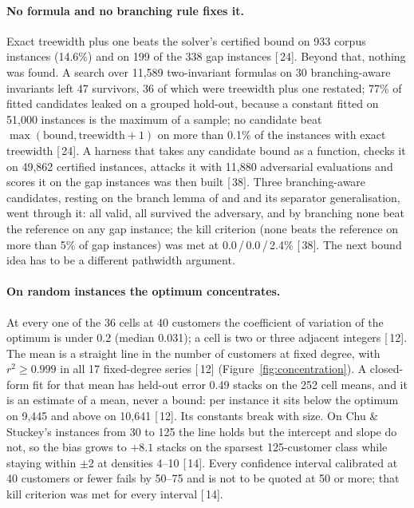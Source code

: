 \documentclass[11pt,a4paper]{article}
\renewcommand{\S}[1]{[\textsection\,#1]}
\begin{document}
\paragraph{No formula and no branching rule fixes it.}
Exact treewidth plus one beats the solver's certified bound on 933 corpus
instances (14.6\%) and on 199 of the 338 gap instances \S{24}. Beyond that,
nothing was found. A search over 11,589 two-invariant formulas on 30
branching-aware invariants left 47 survivors, 36 of which were treewidth plus
one restated; 77\% of fitted candidates leaked on a grouped hold-out, because
a constant fitted on 51,000 instances is the maximum of a sample; no
candidate beat $\max(\text{bound}, \text{treewidth}+1)$ on more than 0.1\% of
the instances with exact treewidth \S{24}. A harness that takes any candidate
bound as a function, checks it on 49,862 certified instances, attacks it with
11,880 adversarial evaluations and scores it on the gap instances was then
built \S{38}. Three branching-aware candidates, resting on the branch lemma
of \citet{FL1987} and \citet{Kinnersley1992} and its separator
generalisation, went through it: all valid, all survived the adversary, and
by branching none beat the reference on any gap instance; the kill criterion
(none beats the reference on more than 5\% of gap instances) was met at
0.0\,/\,0.0\,/\,2.4\% \S{38}. The next bound idea has to be a different
pathwidth argument.

\paragraph{On random instances the optimum concentrates.}
At every one of the 36 cells at 40 customers the coefficient of variation of
the optimum is under 0.2 (median 0.031); a cell is two or three adjacent
integers \S{12}. The mean is a straight line in the number of customers at
fixed degree, with $r^2 \ge 0.999$ in all 17 fixed-degree series \S{12}
(Figure~\ref{fig:concentration}). A closed-form fit for that mean has
held-out error 0.49 stacks on the 252 cell means, and it is an estimate of a
mean, never a bound: per instance it sits below the optimum on 9,445 and
above on 10,641 \S{12}. Its constants break with size. On Chu \& Stuckey's
instances from 30 to 125 the line holds but the intercept and slope do not,
so the bias grows to $+8.1$ stacks on the sparsest 125-customer class while
staying within $\pm 2$ at densities 4--10 \S{14}. Every confidence interval
calibrated at 40 customers or fewer fails by 50--75 and is not to be quoted
at 50 or more; that kill criterion was met for every interval \S{14}.
\end{document}
